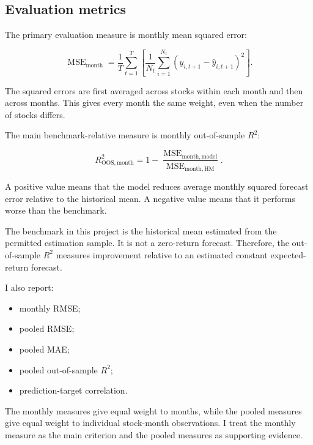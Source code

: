 \documentclass[11pt,a4paper]{article}
\begin{document}
\subsection{Evaluation metrics}

The primary evaluation measure is monthly mean squared error:

\begin{equation}
 \operatorname{MSE}_{\mathrm{month}}
 =
 \frac{1}{T}
 \sum_{t=1}^{T}
 \left[
 \frac{1}{N_t}
 \sum_{i=1}^{N_t}
 \left(
 y_{i,t+1}
 -
 \widehat{y}_{i,t+1}
 \right)^2
 \right].
 \label{eq:monthly-mse}
\end{equation}

The squared errors are first averaged across stocks within each month and then
across months. This gives every month the same weight, even when the number of
stocks differs.

The main benchmark-relative measure is monthly out-of-sample \(R^2\):

\begin{equation}
 R^2_{\mathrm{OOS,month}}
 =
 1
 -
 \frac{
   \operatorname{MSE}_{\mathrm{month,model}}
 }{
   \operatorname{MSE}_{\mathrm{month,HM}}
 }.
 \label{eq:monthly-oos-r2}
\end{equation}

A positive value means that the model reduces average monthly squared forecast
error relative to the historical mean. A negative value means that it performs
worse than the benchmark.

The benchmark in this project is the historical mean estimated from the
permitted estimation sample. It is not a zero-return forecast. Therefore, the
out-of-sample \(R^2\) measures improvement relative to an estimated constant
expected-return forecast.

I also report:

\begin{itemize}
  \item monthly RMSE;
  \item pooled RMSE;
  \item pooled MAE;
  \item pooled out-of-sample \(R^2\);
  \item prediction-target correlation.
\end{itemize}

The monthly measures give equal weight to months, while the pooled measures
give equal weight to individual stock-month observations. I treat the monthly
measure as the main criterion and the pooled measures as supporting evidence.
\end{document}
